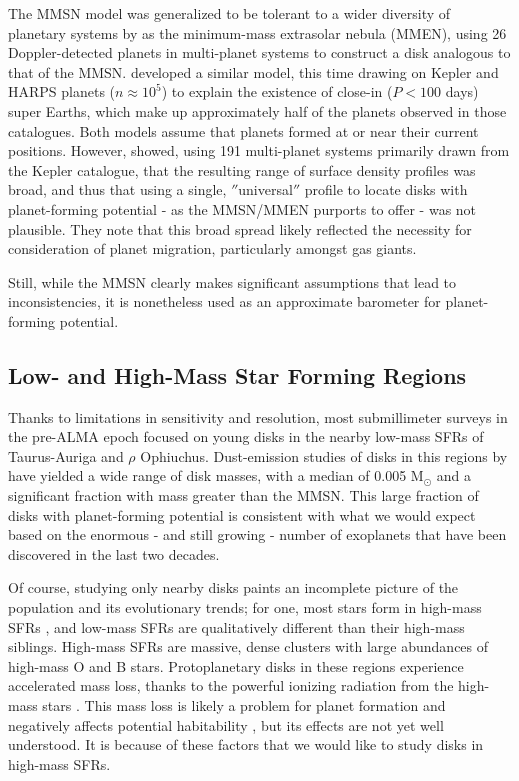 The MMSN model was generalized to be tolerant to a wider diversity of planetary systems by \citet{Kuchner2004} as the minimum-mass extrasolar nebula (MMEN), using 26 Doppler-detected planets in multi-planet systems to construct a disk analogous to that of the MMSN. \citet{ChiangLaughlin2013} developed a similar model, this time drawing on Kepler and HARPS planets ($n \approx 10^5$) to explain the existence of close-in ($P < 100$ days) super Earths, which make up approximately half of the planets observed in those catalogues. Both models assume that planets formed at or near their current positions. However, \citet{Raymond2014} showed, using 191 multi-planet systems primarily drawn from the Kepler catalogue, that the resulting range of surface density profiles was broad, and thus that using a single, $''$universal$''$ profile to locate disks with planet-forming potential - as the MMSN/MMEN purports to offer - was not plausible. They note that this broad spread likely reflected the necessity for consideration of planet migration, particularly amongst gas giants.

Still, while the MMSN clearly makes significant assumptions that lead to inconsistencies, it is nonetheless used as an approximate barometer for planet-forming potential.




\subsection{Low- and High-Mass Star Forming Regions}
Thanks to limitations in sensitivity and resolution, most submillimeter surveys in the pre-ALMA epoch focused on young disks in the nearby low-mass SFRs of Taurus-Auriga and $\rho$ Ophiuchus. Dust-emission studies of disks in this regions by \citet{AndrewsWilliams2005,AndrewsWilliams2007} have yielded a wide range of disk masses, with a median of 0.005 M$_{\odot}$ and a significant fraction with mass greater than the MMSN. This large fraction of disks with planet-forming potential is consistent with what we would expect based on the enormous - and still growing - number of exoplanets that have been discovered in the last two decades.


Of course, studying only nearby disks paints an incomplete picture of the population and its evolutionary trends; for one, most stars form in high-mass SFRs \citep{LadaLada2003,Mann2015}, and low-mass SFRs are qualitatively different than their high-mass siblings. High-mass SFRs are massive, dense clusters with large abundances of high-mass O and B stars. Protoplanetary disks in these regions experience accelerated mass loss, thanks to the powerful ionizing radiation from the high-mass stars \citep{Anderson2013,Kalyaan2015,Xiao2018}. This mass loss is likely a problem for planet formation \citep{Johnstone1998,Ovelar2012} and negatively affects potential habitability \citep{Kruijssen2019}, but its effects are not yet well understood. It is because of these factors that we would like to study disks in high-mass SFRs.


